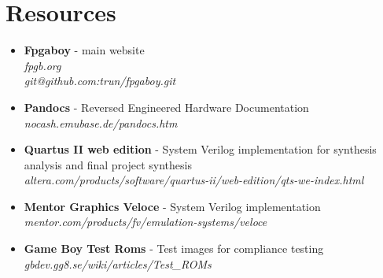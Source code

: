 \section{Resources}
\begin{itemize}
    \item {\bf Fpgaboy}
            - main website\\
            {\it fpgb.org} \\
            {\it git@github.com:trun/fpgaboy.git}
    \item {\bf Pandocs} - Reversed Engineered Hardware Documentation\\ 
            {\it nocash.emubase.de/pandocs.htm}
    \item {\bf Quartus II web edition} - System Verilog implementation 
             for synthesis analysis and final project synthesis\\
            {\it altera.com/products/software/quartus-ii/web-edition/qts-we-index.html}
    \item {\bf Mentor Graphics Veloce} - System Verilog implementation\\
            {\it mentor.com/products/fv/emulation-systems/veloce}
    \item {\bf Game Boy Test Roms}     - Test images for compliance testing\\
           {\it gbdev.gg8.se/wiki/articles/Test\_ROMs}

\end{itemize}

